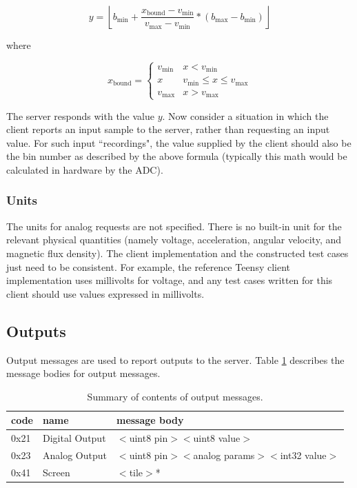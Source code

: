 \documentclass[12pt]{article}
\begin{document}
\begin{appendices}
$$y = \left \lfloor b_{\text{min}} + \frac{x_{\text{bound}}-v_{\text{min}}}{v_{\text{max}}-v_{\text{min}}} * (b_{\text{max}}-b_{\text{min}}) \right \rfloor$$

where

\begin{equation*}
x_{\text{bound}} = \begin{cases} 
      v_{\text{min}} & x < v_{\text{min}} \\
      x & v_{\text{min}} \le x \le v_{\text{max}} \\
      v_{\text{max}} & x > v_{\text{max}}
   \end{cases}
\end{equation*}

The server responds with the value $y$.  Now consider a situation in which the client reports an input sample to the server, rather than requesting an input value.  For such input ``recordings", the value supplied by the client should also be the bin number as described by the above formula (typically this math would be calculated in hardware by the ADC).

\subsubsection{Units}
The units for analog requests are not specified.  There is no built-in unit for the relevant physical quantities (namely voltage, acceleration, angular velocity, and magnetic flux density).  The client implementation and the constructed test cases just need to be consistent.  For example, the reference Teensy client implementation uses millivolts for voltage, and any test cases written for this client should use values expressed in millivolts.

\subsection{Outputs}
Output messages are used to report outputs to the server.  Table \ref{table:output-messages} describes the message bodies for output messages.

\begin{table}[ht]
\begin{center}
\begin{tabular}{l l l}
code & name & message body \\ \hline
0x21 & Digital Output & $<$uint8 pin$>$$<$uint8 value$>$ \\
0x23 & Analog Output & $<$uint8 pin$>$$<$analog params$>$$<$int32 value$>$ \\
0x41 & Screen & $<$tile$>$* \\
\end{tabular}
\caption{Summary of contents of output messages.}
\label{table:output-messages}
\end{center}
\end{table}


\end{appendices}
\end{document}
